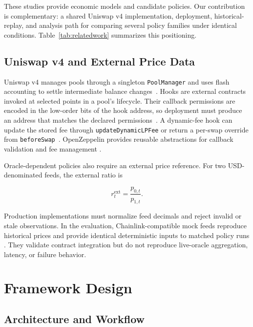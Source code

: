 \documentclass[a4paper,conference]{IEEEtran}
\begin{document}
These studies provide economic models and candidate policies. Our
contribution is complementary: a shared Uniswap v4 implementation,
deployment, historical-replay, and analysis path for comparing several
policy families under identical conditions. Table~\ref{tab:relatedwork}
summarizes this positioning.

\subsection{Uniswap v4 and External Price Data}

Uniswap v4 manages pools through a singleton
\texttt{PoolManager} and uses flash accounting to settle intermediate
balance changes~\cite{adams2024uniswapv4}. Hooks are external contracts
invoked at selected points in a pool's lifecycle. Their callback
permissions are encoded in the low-order bits of the hook address, so
deployment must produce an address that matches the declared
permissions~\cite{uniswapHooksDocs,uniswapHookDeployment}. A
dynamic-fee hook can update the stored fee through
\texttt{updateDynamicLPFee} or return a per-swap override from
\texttt{beforeSwap}~\cite{uniswapDynamicFees}. OpenZeppelin provides
reusable abstractions for callback validation and fee management
\cite{openzeppelinHooks}.

Oracle-dependent policies also require an external price reference.
For two USD-denominated feeds, the external ratio is

\begin{equation}
  r_t^{\mathrm{ext}}
  =
  \frac{p_{0,t}}{p_{1,t}}.
  \label{eq:external-ratio}
\end{equation}

Production implementations must normalize feed decimals and reject
invalid or stale observations. In the evaluation,
Chainlink-compatible mock feeds reproduce historical prices and provide
identical deterministic inputs to matched policy runs
\cite{chainlinkFeeds}. They validate contract integration but do not
reproduce live-oracle aggregation, latency, or failure behavior.

\section{Framework Design}
\label{sec:framework}

\subsection{Architecture and Workflow}
\end{document}
